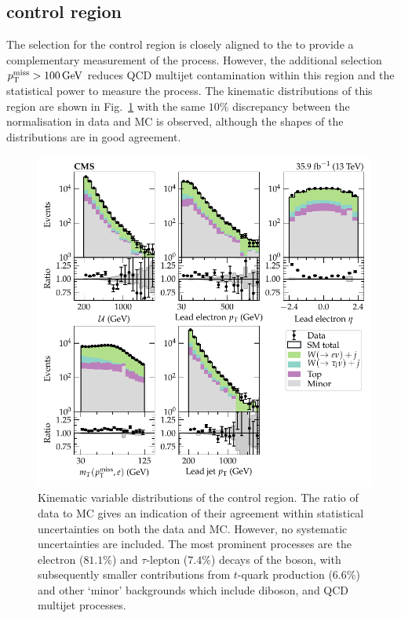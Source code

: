 \subsection{\eleplusjets control region}

The selection for the \eleplusjets control region is closely aligned to the \muplusjets to provide a complementary measurement of the \IWlvj process. However, the additional selection ${p_{\text{T}}^{\mathrm{miss}}>\SI{100}{GeV}}$ reduces QCD multijet contamination within this region and the statistical power to measure the \IWlvj process. The kinematic distributions of this region are shown in Fig.~\ref{fig:eleplusjets} with the same $10\%$ discrepancy between the normalisation in data and MC is observed, although the shapes of the distributions are in good agreement.
%
\begin{figure}[htb]
    \centering
    \includegraphics{chapters/042_backgrounds/images/singleele_dists.pdf}
    \caption[Single electron final state kinematics.]{
        Kinematic variable distributions of the \eleplusjets control region. The ratio of data to MC gives an indication of their agreement within statistical uncertainties on both the data and MC. However, no systematic uncertainties are included. The most prominent processes are the electron ($81.1\%$) and $\tau$-lepton ($7.4\%$) decays of the \PW boson, with subsequently smaller contributions from $t$-quark production ($6.6\%$) and other `minor' backgrounds which include diboson, \IDYee and QCD multijet processes.
    }
    \label{fig:eleplusjets}
\end{figure}
